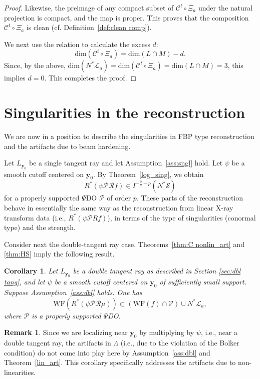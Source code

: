 \documentclass[11pt]{article}
\newcommand{\be}{\begin{equation}}
\newcommand{\ee}{\end{equation}}
\newcommand{\s}{\mathcal S}
\newcommand{\cC}{\mathcal C}
\newcommand{\WF}{\mathrm{WF}}
\newcommand{\CL}{\mathcal L}
\newcommand{\CP}{\mathcal P}
\newcommand{\CR}{\mathcal R}
\numberwithin{equation}{section}
\newcommand{\vy}{\mathbf{y}}
\newcommand{\Cc}{\mathcal{C}}
\newtheorem{corollary}[theorem]{Corollary}
\theoremstyle{definition}
\newtheorem{remark}{Remark}
\begin{document}
\begin{proof}
Likewise, the preimage of any compact subset of $\cC^t \circ \Xi_a$ under the natural projection is compact, and the map is proper. This proves that the composition $\Cc^t \circ \Xi_a$ is clean (cf. Definition~\ref{def:clean comp}).

We next use the relation \cite[page 458]{trev2} to calculate the excess $d$:
\be
\text{dim}(\Cc^t \circ \Xi_a) = \text{dim}(L\cap M) - d.
\ee
Since, by the above, $\text{dim}(N^*\CL_a) = \text{dim}(\Cc^t \circ \Xi_a) = \text{dim}(L\cap M) = 3$, this implies $d = 0$. This completes the proof.
\end{proof}

\section{Singularities in the reconstruction}\label{sec: sing recon}

We are now in a position to describe the singularities in FBP type reconstruction and the artifacts due to beam hardening.

Let $L_{\vy_0}$ be a single tangent ray and let Assumption~\ref{ass:sngl} hold. Let $\psi$ be a smooth cutoff centered on $\vy_0$. By Theorem~\ref{log_sing}, we obtain 
\be
R^* (\psi \mathcal{P} \CR f) \in I^{-\frac{9}{4} + p}(N^*\s)
\ee
for a properly supported $\Psi$DO $\CP$ of order $p$. These parts of the reconstruction behave in essentially the same way as the reconstruction from linear X-ray transform data (i.e., $R^*(\psi \mathcal{P} Rf)$), in terms of the type of singularities (conormal type) and the strength.

Consider next the double-tangent ray case. Theorems~\ref{thm:C nonlin_art} and \ref{thm:HS} imply the following result.

\begin{corollary}
\label{nonlin_art_thm}
Let $L_{\vy_0}$ be a double tangent ray as described in Section \ref{sec:dbl tang}, and let $\psi$ be a smooth cutoff centered on $\vy_0$ of sufficiently small support. Suppose Assumption~\ref{ass:dbl} holds. One has
\be
\label{nonlin_art_equ v2}
\WF(R^* (\psi\CP\mathcal{R}\mu)) \subset (\WF(f) \cap \mathcal{V}) \cup N^*\CL_a,
\ee
where $\CP$ is a properly supported $\Psi$DO.  
\end{corollary}

\begin{remark}
Since we are localizing near $\vy_0$ by multiplying by $\psi$, i.e., near a double tangent ray, the artifacts in $\Lambda$ (i.e., due to the violation of the Bolker condition) do not come into play here by Assumption~\ref{ass:dbl} and Theorem~\ref{lin_art}. This corollary specifically addresses the artifacts due to non-linearities.
\end{remark}
\end{document}
